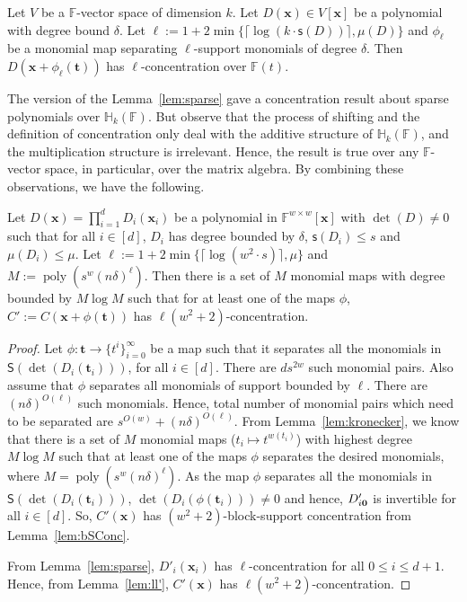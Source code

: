 \documentclass[final,oneeqnum, onethmnum, onefignum]{siamltex1213}
\newcommand{\F}{\mathbb F}
\newcommand{\ceil}[1]{\lceil #1 \rceil}
\DeclareMathOperator{\poly}{poly}
\renewcommand{\sp}{\mathsf{s}} %
\newcommand{\Sp}{\mathsf{S}}
\renewcommand{\H}{\mathbb H}
\begin{document}
\begin{lemma}
\label{lem:sparse}
Let $V$ be a $\F$-vector space of dimension $k$.
Let $D(\mathbf{x}) \in V[\mathbf{x}]$ be a polynomial with
degree bound $\delta$. 
Let $\ell := 1 + 2 \min\{ \ceil{\log (k \cdot \sp(D))}, \mu(D) \}$ and $\phi_{\ell}$ be a
monomial map separating $\ell$-support monomials of degree $\delta$.
Then $D(\mathbf{x}+\phi_{\ell}(\mathbf{t}))$ has $\ell$-concentration
over $\F(t)$.
\end{lemma} 

The \cite{ASS13} version of the Lemma~\ref{lem:sparse} gave
 a concentration result
about sparse polynomials over $\H_k(\F)$. But observe that
the process of shifting and the definition of concentration 
only deal with the additive structure of $\H_k(\F)$,
and the multiplication structure is irrelevant. Hence,
the result is true over any
$\F$-vector space,
in particular,
over the matrix algebra.  
By combining these observations, we have the following. 

\begin{lemma}
\label{lem:ROABPconc}
Let $D(\mathbf{x}) = \prod_{i=1}^{d} D_i(\mathbf{x}_i)$ be a polynomial 
in $\F^{w \times w}[\mathbf{x}]$ with $\det(D) \neq 0$
such that for all $i \in [d]$,
 $D_i$ has degree bounded
by $\delta$, $\sp(D_i) \leq s$ and $\mu(D_i) \leq \mu$.
Let $\ell := 1 + 2 \min\{ \ceil{\log (w^2 \cdot s)}, \mu \}$
and $M :=  \poly(s^w (n \delta)^{\ell})$.
Then there is a set of $M$ monomial maps with degree bounded by
$M \log M$ 
such that for at least one of the maps $\phi$,
$C' := C(\mathbf{x}+\phi(\mathbf{t}))$ has $\ell (w^2+2)$-concentration. 
\end{lemma}
\begin{proof}
Let $\phi \colon \mathbf{t} \to \{t^i\}_{i=0}^{\infty}$ be a map 
such that it separates all the monomials in $\Sp(\det(D_i(\mathbf{t}_i)))$,
for all $i \in [d]$. There are $ds^{2w}$ such monomial pairs. 
Also assume that $\phi$ separates all monomials of support bounded by $\ell$. 
There are $(n \delta)^{O(\ell)}$ such monomials. 
Hence, total number of 
monomial pairs which need to be separated are $s^{O(w)} + (n \delta)^{O(\ell)}$.
From Lemma~\ref{lem:kronecker}, 
we know that there is a set of $M$ monomial maps ($t_i \mapsto t^{w(t_i)}$)
with highest degree $M\log M$ such that at least one of the maps
$\phi$ separates the desired monomials, 
where $M = \poly(s^w (n \delta)^{\ell})$.
As the map $\phi$ separates all the monomials in $\Sp(\det(D_i(\mathbf{t}_i)))$,
$\det(D_i(\phi(\mathbf{t}_i))) \neq 0$ and hence, 
$D'_{i{\bf 0}}$ is invertible for all $i \in [d]$.
So, $C'(\mathbf{x})$ has $(w^2+2)$-block-support concentration from Lemma~\ref{lem:bSConc}.

From Lemma~\ref{lem:sparse}, $D'_i(\mathbf{x}_i)$ has $\ell$-concentration for all 
$0 \leq i \leq d+1$.
Hence, from Lemma~\ref{lem:ll'}, $C'(\mathbf{x})$ has $\ell (w^2+2)$-concentration.  
\end{proof}
\end{document}

